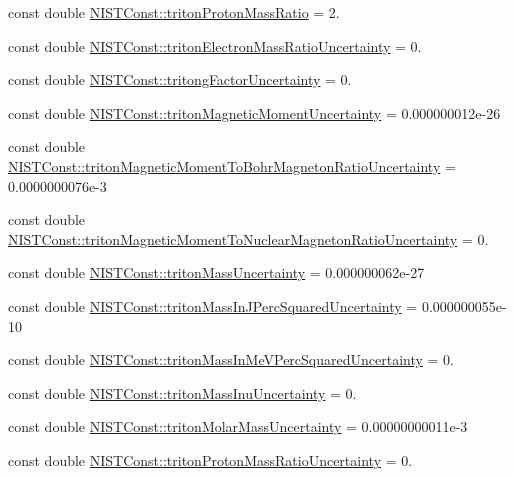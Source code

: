 \begin{DoxyCompactItemize}
\item 
const double \hyperlink{group___n_i_s_t_const-_triton_ga955fba44514fff409bec435aadc11f40}{N\+I\+S\+T\+Const\+::triton\+Proton\+Mass\+Ratio} = 2.
\item 
const double \hyperlink{group___n_i_s_t_const-_triton_ga43a36ee61c22d41cc102de17cdf9cb1b}{N\+I\+S\+T\+Const\+::triton\+Electron\+Mass\+Ratio\+Uncertainty} = 0.
\item 
const double \hyperlink{group___n_i_s_t_const-_triton_ga824f5530282c21500ff7352e8378ed3d}{N\+I\+S\+T\+Const\+::tritong\+Factor\+Uncertainty} = 0.
\item 
const double \hyperlink{group___n_i_s_t_const-_triton_ga8ea2250613d1058051f593174dd49d51}{N\+I\+S\+T\+Const\+::triton\+Magnetic\+Moment\+Uncertainty} = 0.\+000000012e-\/26
\item 
const double \hyperlink{group___n_i_s_t_const-_triton_ga90cd9ae71d4a15d0b558ca26fc76a3b2}{N\+I\+S\+T\+Const\+::triton\+Magnetic\+Moment\+To\+Bohr\+Magneton\+Ratio\+Uncertainty} = 0.\+0000000076e-\/3
\item 
const double \hyperlink{group___n_i_s_t_const-_triton_ga94375708a2cf3b8525660954fb92c624}{N\+I\+S\+T\+Const\+::triton\+Magnetic\+Moment\+To\+Nuclear\+Magneton\+Ratio\+Uncertainty} = 0.
\item 
const double \hyperlink{group___n_i_s_t_const-_triton_gad151a313683f9e24ebd12e917f3905bb}{N\+I\+S\+T\+Const\+::triton\+Mass\+Uncertainty} = 0.\+000000062e-\/27
\item 
const double \hyperlink{group___n_i_s_t_const-_triton_ga674bff21cbff4ff6e6591ce4cc78be70}{N\+I\+S\+T\+Const\+::triton\+Mass\+In\+J\+Perc\+Squared\+Uncertainty} = 0.\+000000055e-\/10
\item 
const double \hyperlink{group___n_i_s_t_const-_triton_ga6fedf10502d91c9a164d6c7f0eae67d9}{N\+I\+S\+T\+Const\+::triton\+Mass\+In\+Me\+V\+Perc\+Squared\+Uncertainty} = 0.
\item 
const double \hyperlink{group___n_i_s_t_const-_triton_ga5e2b2cf0ce15ac450f9a6ca418766347}{N\+I\+S\+T\+Const\+::triton\+Mass\+Inu\+Uncertainty} = 0.
\item 
const double \hyperlink{group___n_i_s_t_const-_triton_gac5146732c0b02aee0b636ea942e54424}{N\+I\+S\+T\+Const\+::triton\+Molar\+Mass\+Uncertainty} = 0.\+00000000011e-\/3
\item 
const double \hyperlink{group___n_i_s_t_const-_triton_ga80e5194cefd8b0a5620ab8708e04f78b}{N\+I\+S\+T\+Const\+::triton\+Proton\+Mass\+Ratio\+Uncertainty} = 0.
\end{DoxyCompactItemize}


